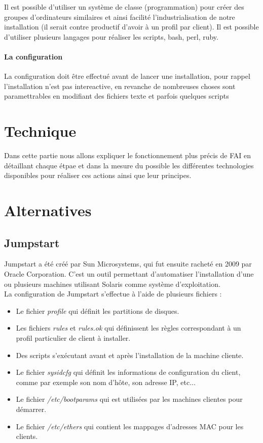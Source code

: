 \documentclass[a4paper,12pt,one side,titlepage]{report}
\begin{document}
Il est possible d'utiliser un système de classe (programmation) pour créer des groupes d'ordinateurs similaires et ainsi facilité l'industrialisation de notre installation (il serait contre productif d'avoir à un profil par client). Il est possible d'utiliser plusieurs langages pour réaliser les scripts, bash, perl, ruby.

\subsubsection{La configuration}
La configuration doit être effectué avant de lancer une installation, pour rappel l'installation n'est pas intereactive, en revanche de nombreuses choses sont paramettrables en modifiant des fichiers texte et parfois quelques scripts 


\chapter{Technique}
Dans cette partie nous allons expliquer le fonctionnement plus précis de FAI en détaillant chaque étpae et dans la mesure du possible les différentes technologies disponibles pour réaliser ces actions ainsi que leur principes. 

\chapter{Alternatives}

\section{Jumpstart}
Jumpstart a été créé par Sun Microsystems, qui fut ensuite racheté en 2009 par Oracle Corporation. C'est un outil permettant d'automatiser l'installation d'une ou plusieurs machines utilisant Solaris comme système d'exploitation.\\
La configuration de Jumpstart s'effectue à l'aide de plusieurs fichiers :\\
\begin{itemize}
  \item Le fichier \textit{profile} qui définit les partitions de disques.
  \item Les fichiers \textit{rules} et \textit{rules.ok} qui définissent les règles correspondant à un profil particulier de client à installer.
  \item Des scripts s'exécutant avant et après l'installation de la machine cliente.
  \item Le fichier \textit{sysidcfg} qui définit les informations de configuration du client, comme par exemple son nom d'hôte, son adresse IP, etc...
  \item Le fichier \textit{/etc/bootparams} qui est utilisées par les machines clientes pour démarrer.
  \item Le fichier \textit{/etc/ethers} qui contient les mappages d'adresses MAC pour les clients.\\
\end{itemize}
\end{document}

